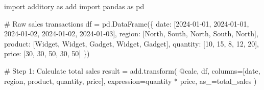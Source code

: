 \documentclass[
  letterpaper,
]{scrbook}
\newenvironment{Shaded}{\begin{snugshade}}{\end{snugshade}}
\newcommand{\CommentTok}[1]{\textcolor[rgb]{0.37,0.37,0.37}{#1}}
\newcommand{\DecValTok}[1]{\textcolor[rgb]{0.68,0.00,0.00}{#1}}
\newcommand{\ImportTok}[1]{\textcolor[rgb]{0.00,0.46,0.62}{#1}}
\newcommand{\NormalTok}[1]{\textcolor[rgb]{0.00,0.23,0.31}{#1}}
\newcommand{\OperatorTok}[1]{\textcolor[rgb]{0.37,0.37,0.37}{#1}}
\newcommand{\StringTok}[1]{\textcolor[rgb]{0.13,0.47,0.30}{#1}}
\begin{document}
\begin{Shaded}
\begin{Highlighting}[]
\ImportTok{import}\NormalTok{ additory }\ImportTok{as}\NormalTok{ add}
\ImportTok{import}\NormalTok{ pandas }\ImportTok{as}\NormalTok{ pd}

\CommentTok{\# Raw sales transactions}
\NormalTok{df }\OperatorTok{=}\NormalTok{ pd.DataFrame(\{}
    \StringTok{\textquotesingle{}date\textquotesingle{}}\NormalTok{: [}\StringTok{\textquotesingle{}2024{-}01{-}01\textquotesingle{}}\NormalTok{, }\StringTok{\textquotesingle{}2024{-}01{-}01\textquotesingle{}}\NormalTok{, }\StringTok{\textquotesingle{}2024{-}01{-}02\textquotesingle{}}\NormalTok{, }\StringTok{\textquotesingle{}2024{-}01{-}02\textquotesingle{}}\NormalTok{, }\StringTok{\textquotesingle{}2024{-}01{-}03\textquotesingle{}}\NormalTok{],}
    \StringTok{\textquotesingle{}region\textquotesingle{}}\NormalTok{: [}\StringTok{\textquotesingle{}North\textquotesingle{}}\NormalTok{, }\StringTok{\textquotesingle{}South\textquotesingle{}}\NormalTok{, }\StringTok{\textquotesingle{}North\textquotesingle{}}\NormalTok{, }\StringTok{\textquotesingle{}South\textquotesingle{}}\NormalTok{, }\StringTok{\textquotesingle{}North\textquotesingle{}}\NormalTok{],}
    \StringTok{\textquotesingle{}product\textquotesingle{}}\NormalTok{: [}\StringTok{\textquotesingle{}Widget\textquotesingle{}}\NormalTok{, }\StringTok{\textquotesingle{}Widget\textquotesingle{}}\NormalTok{, }\StringTok{\textquotesingle{}Gadget\textquotesingle{}}\NormalTok{, }\StringTok{\textquotesingle{}Widget\textquotesingle{}}\NormalTok{, }\StringTok{\textquotesingle{}Gadget\textquotesingle{}}\NormalTok{],}
    \StringTok{\textquotesingle{}quantity\textquotesingle{}}\NormalTok{: [}\DecValTok{10}\NormalTok{, }\DecValTok{15}\NormalTok{, }\DecValTok{8}\NormalTok{, }\DecValTok{12}\NormalTok{, }\DecValTok{20}\NormalTok{],}
    \StringTok{\textquotesingle{}price\textquotesingle{}}\NormalTok{: [}\DecValTok{30}\NormalTok{, }\DecValTok{30}\NormalTok{, }\DecValTok{50}\NormalTok{, }\DecValTok{30}\NormalTok{, }\DecValTok{50}\NormalTok{]}
\NormalTok{\})}

\CommentTok{\# Step 1: Calculate total sales}
\NormalTok{result }\OperatorTok{=}\NormalTok{ add.transform(}
    \StringTok{\textquotesingle{}@calc\textquotesingle{}}\NormalTok{,}
\NormalTok{    df,}
\NormalTok{    columns}\OperatorTok{=}\NormalTok{[}\StringTok{\textquotesingle{}date\textquotesingle{}}\NormalTok{, }\StringTok{\textquotesingle{}region\textquotesingle{}}\NormalTok{, }\StringTok{\textquotesingle{}product\textquotesingle{}}\NormalTok{, }\StringTok{\textquotesingle{}quantity\textquotesingle{}}\NormalTok{, }\StringTok{\textquotesingle{}price\textquotesingle{}}\NormalTok{],}
\NormalTok{    expression}\OperatorTok{=}\StringTok{\textquotesingle{}quantity * price\textquotesingle{}}\NormalTok{,}
\NormalTok{    as\_}\OperatorTok{=}\StringTok{\textquotesingle{}total\_sales\textquotesingle{}}
\NormalTok{)}


\end{Highlighting}
\end{Shaded}
\end{document}
